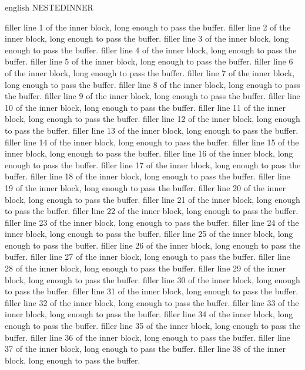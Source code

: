 \begin{onlyin}{english}
NESTEDINNER

filler line 1 of the inner block, long enough to pass the buffer.
filler line 2 of the inner block, long enough to pass the buffer.
filler line 3 of the inner block, long enough to pass the buffer.
filler line 4 of the inner block, long enough to pass the buffer.
filler line 5 of the inner block, long enough to pass the buffer.
filler line 6 of the inner block, long enough to pass the buffer.
filler line 7 of the inner block, long enough to pass the buffer.
filler line 8 of the inner block, long enough to pass the buffer.
filler line 9 of the inner block, long enough to pass the buffer.
filler line 10 of the inner block, long enough to pass the buffer.
filler line 11 of the inner block, long enough to pass the buffer.
filler line 12 of the inner block, long enough to pass the buffer.
filler line 13 of the inner block, long enough to pass the buffer.
filler line 14 of the inner block, long enough to pass the buffer.
filler line 15 of the inner block, long enough to pass the buffer.
filler line 16 of the inner block, long enough to pass the buffer.
filler line 17 of the inner block, long enough to pass the buffer.
filler line 18 of the inner block, long enough to pass the buffer.
filler line 19 of the inner block, long enough to pass the buffer.
filler line 20 of the inner block, long enough to pass the buffer.
filler line 21 of the inner block, long enough to pass the buffer.
filler line 22 of the inner block, long enough to pass the buffer.
filler line 23 of the inner block, long enough to pass the buffer.
filler line 24 of the inner block, long enough to pass the buffer.
filler line 25 of the inner block, long enough to pass the buffer.
filler line 26 of the inner block, long enough to pass the buffer.
filler line 27 of the inner block, long enough to pass the buffer.
filler line 28 of the inner block, long enough to pass the buffer.
filler line 29 of the inner block, long enough to pass the buffer.
filler line 30 of the inner block, long enough to pass the buffer.
filler line 31 of the inner block, long enough to pass the buffer.
filler line 32 of the inner block, long enough to pass the buffer.
filler line 33 of the inner block, long enough to pass the buffer.
filler line 34 of the inner block, long enough to pass the buffer.
filler line 35 of the inner block, long enough to pass the buffer.
filler line 36 of the inner block, long enough to pass the buffer.
filler line 37 of the inner block, long enough to pass the buffer.
filler line 38 of the inner block, long enough to pass the buffer.

\end{onlyin}
